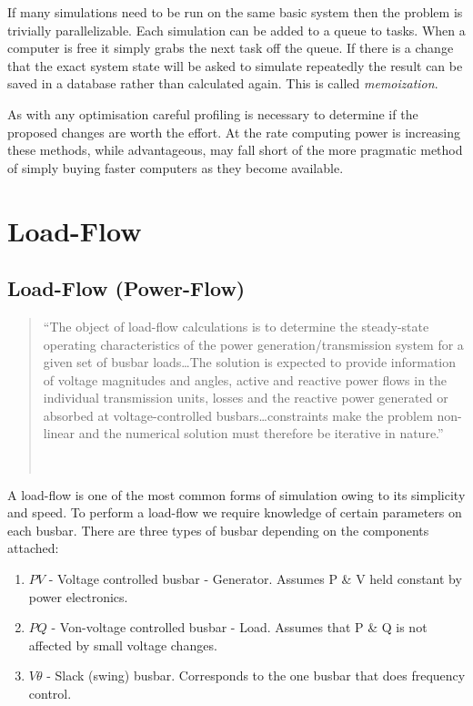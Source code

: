 \documentclass[a4paper,oneside,12pt]{report}
\newcommand{\tmpquotecite}{}%
\newenvironment{myquote}[1][]
{\renewcommand{\tmpquotecite}{#1}\begin{quote}\begin{itshape}``}
{''\end{itshape}~{\normalfont~\tmpquotecite}\end{quote}}
\begin{document}
If many simulations need to be run on the same basic system then the problem is trivially parallelizable. Each simulation can be added to a queue to tasks. When a computer is free it simply grabs the next task off the queue. If there is a change that the exact system state will be asked to simulate repeatedly the result can be saved in a database rather than calculated again. This is called \emph{memoization}.

As with any optimisation careful profiling is necessary to determine if the proposed changes are worth the effort. At the rate computing power is increasing these methods, while advantageous, may fall short of the more pragmatic method of simply buying faster computers as they become available.


\section{Load-Flow}

\subsection{Load-Flow (Power-Flow)}

\begin{myquote}[\cite{Arrillaga1990}]The object of load-flow calculations is to determine the steady-state operating characteristics of the power generation/transmission system for a given set of busbar loads\dots The solution is expected to provide information of voltage magnitudes and angles, active and reactive power flows in the individual transmission units, losses and the reactive power generated or absorbed at voltage-controlled busbars\dots constraints make the problem non-linear and the numerical solution must therefore be iterative in nature.\end{myquote}

A load-flow is one of the most common forms of simulation owing to its simplicity and speed. To perform a load-flow we require knowledge of certain parameters on each busbar. There are three types of busbar depending on the components attached:

\begin{enumerate}
\item $PV$ - Voltage controlled busbar - Generator. Assumes P \& V held constant by power electronics.
\item $PQ$ - Von-voltage controlled busbar - Load. Assumes that P \& Q is not affected by small voltage changes.
\item $V\theta$ - Slack (swing) busbar. Corresponds to the one busbar that does frequency control.
\end{enumerate}
\end{document}
